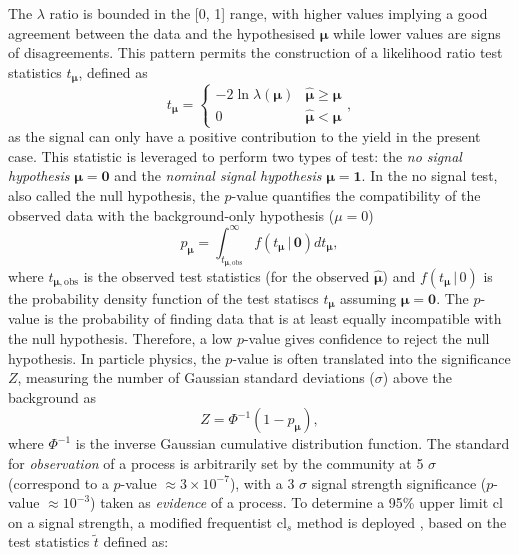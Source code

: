 The $\lambda$ ratio is bounded in the  [0, 1] range, with higher values implying a good agreement between the data and the hypothesised $\boldsymbol{\mu}$ while lower values are signs of disagreements. This pattern permits the construction of a likelihood ratio test statistics $t_{\boldsymbol{\mu}}$, defined as \cite{asympForm}
\begin{equation}\label{eq-lik-ratio-test}
    t_{\boldsymbol{\mu}} =
      \begin{cases}
        -2 \ln \lambda(\boldsymbol{\mu}) & \hat{\boldsymbol{\mu}} \geq \boldsymbol{\mu} \\
        0 & \hat{\boldsymbol{\mu}} < \boldsymbol{\mu}
      \end{cases},
\end{equation}
as the signal can only have a positive contribution to the yield in the present case. This statistic is leveraged to perform two types of test: the \textit{no signal hypothesis} $\boldsymbol{\mu} = \boldsymbol{0}$ and the \textit{nominal signal hypothesis} $\boldsymbol{\mu} = \boldsymbol{1}$. In the no signal test, also called the null hypothesis, the $p$-value quantifies the compatibility of the observed data with the background-only hypothesis ($\mu = 0$)
\begin{equation}
    p_{\boldsymbol{\mu}}=\int_{t_{\boldsymbol{\mu},\mathrm{obs}}}^{\infty} f(t_{\boldsymbol{\mu}} \,| \, \boldsymbol{0}) dt_{\boldsymbol{\mu}},
\end{equation}
where $t_{\boldsymbol{\mu},\mathrm{obs}}$ is the observed test statistics (for the observed $\hat{\boldsymbol{\mu}}$) and $f(t_{\boldsymbol{\mu}} \,| \,0)$ is the probability density function of the test statiscs $t_{\boldsymbol{\mu}}$ assuming $\boldsymbol{\mu} = \boldsymbol{0}$. The $p$-value is the probability of finding data that is at least equally incompatible with the null hypothesis. Therefore, a low $p$-value gives confidence to reject the null hypothesis. In particle physics, the $p$-value is often translated into the significance $Z$, measuring the number of Gaussian standard deviations ($\sigma$) above the background as
\begin{equation}
    Z = \Phi^{-1}(1-p_{\boldsymbol{\mu}}),
\end{equation}
where $\Phi^{-1}$ is the inverse Gaussian cumulative distribution function. The standard for \textit{observation} of a process is arbitrarily set by the community at 5 $\sigma$ (correspond to a $p$-value $\approx 3 \times 10^{-7}$), with a 3 $\sigma$ signal strength significance ($p$-value $\approx 10^{-3}$) taken as \textit{evidence} of a process. To determine a 95\% upper limit \gls{cl} on a signal strength, a modified frequentist \gls{cl}$_s$ method is deployed \cite{asympForm, ALRead_2002}, based on the test statistics $\tilde{t}$ defined as:
